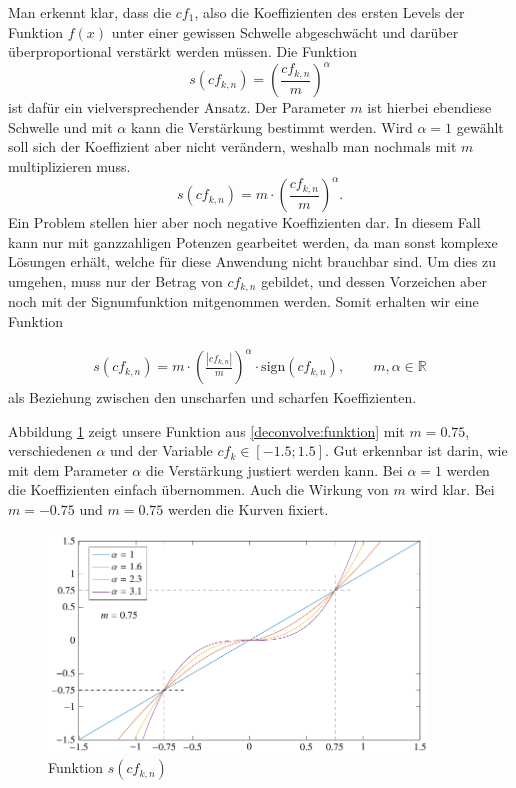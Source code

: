 Man erkennt klar, dass die $cf_1$, also die Koeffizienten des ersten Levels der Funktion $f(x)$ unter einer gewissen Schwelle abgeschwächt und darüber überproportional verstärkt werden müssen.
Die Funktion
$$s(cf_{k,n}) = \left( \frac{cf_{k,n}}{m}\right)^\alpha$$
ist dafür ein vielversprechender Ansatz.
Der Parameter $m$ ist hierbei ebendiese Schwelle und mit $\alpha$ kann die Verstärkung bestimmt werden.
Wird $\alpha = 1$ gewählt soll sich der Koeffizient aber nicht verändern, weshalb man nochmals mit $m$ multiplizieren muss.
$$s(cf_{k,n}) = m\cdot \left( \frac{cf_{k,n}}{m}\right)^\alpha.$$
Ein Problem stellen hier aber noch negative Koeffizienten dar. In diesem Fall kann nur mit ganzzahligen Potenzen gearbeitet werden, da man sonst komplexe Lösungen erhält, welche für diese Anwendung nicht brauchbar sind.
Um dies zu umgehen, muss nur der Betrag von $cf_{k,n}$ gebildet, und dessen Vorzeichen aber noch mit der Signumfunktion mitgenommen werden.
Somit erhalten wir eine Funktion

\begin{align}
s(cf_{k,n})=m\cdot \left(\frac{|cf_{k,n}|}{m}\right)^{\alpha}\cdot \text{sign}(cf_{k,n}), \qquad m,\alpha\in\mathbb{R}
\label{deconvolve:funktion}
\end{align}
als Beziehung zwischen den \glqq unscharfen\grqq{} und \glqq scharfen\grqq{} Koeffizienten.

Abbildung \ref{deconvolve:function} zeigt unsere Funktion aus \eqref{deconvolve:funktion} mit $m=0.75$, verschiedenen $\alpha$ und der Variable $cf_k\in[-1.5;1.5]$.
Gut erkennbar ist darin, wie mit dem Parameter $\alpha$ die Verstärkung justiert werden kann.
Bei $\alpha = 1$ werden die Koeffizienten einfach übernommen.
Auch die Wirkung von $m$ wird klar.
Bei $m=-0.75$ und $m=0.75$ werden die Kurven fixiert.
\begin{figure}
\centering
\includegraphics[width=0.9\textwidth]{./papers/deconvolve/pictures/function.pdf}
\caption{Funktion $s(cf_{k,n})$\label{deconvolve:function}}
\end{figure}

